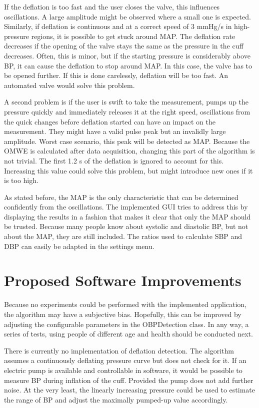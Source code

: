 If the deflation is too fast and the user closes the valve, this influences oscillations. A large amplitude might be observed where a small one is expected. Similarly, if deflation is continuous and at a correct speed of 3 mmHg/s in high-pressure regions, it is possible to get stuck around MAP. The deflation rate decreases if the opening of the valve stays the same as the pressure in the cuff decreases. Often, this is minor, but if the starting pressure is considerably above BP, it can cause the deflation to stop around MAP. In this case, the valve has to be opened further. If this is done carelessly, deflation will be too fast. An automated valve would solve this problem. 

A second problem is if the user is swift to take the measurement, pumps up the pressure quickly and immediately releases it at the right speed, oscillations from the quick changes before deflation started can have an impact on the measurement. They might have a valid pulse peak but an invalidly large amplitude. Worst case scenario, this peak will be detected as MAP. Because the OMWE is calculated after data acquisition, changing this part of the algorithm is not trivial. The first 1.2 s of the deflation is ignored to account for this. Increasing this value could solve this problem, but might introduce new ones if it is too high. 

As stated before, the MAP is the only characteristic that can be determined confidently from the oscillations. The implemented GUI tries to address this by displaying the results in a fashion that makes it clear that only the MAP should be trusted. Because many people know about systolic and diastolic BP, but not about the MAP, they are still included. The ratios used to calculate SBP and DBP can easily be adapted in the settings menu.


\section{Proposed Software Improvements}

Because no experiments could be performed with the implemented application, the algorithm may have a subjective bias. Hopefully, this can be improved by adjusting the configurable parameters in the OBPDetection class. In any way, a series of tests, using people of different age and health should be conducted next. 

There is currently no implementation of deflation detection. The algorithm assumes a continuously deflating pressure curve but does not check for it. If an electric pump is available and controllable in software, it would be possible to measure BP during inflation of the cuff. Provided the pump does not add further noise. At the very least, the linearly increasing pressure could be used to estimate the range of BP and adjust the maximally pumped-up value accordingly.

